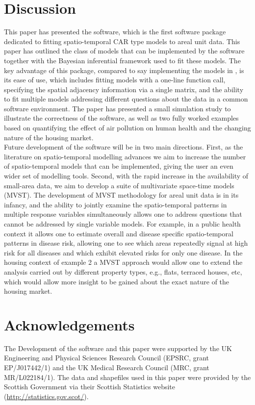 \documentclass[article, nojss]{jss}
\begin{document}
\section{Discussion}
This paper has presented the  software, which is the first software package dedicated to fitting spatio-temporal CAR type models to areal unit data. This paper has outlined the class of models that can be implemented by the software together with the Bayesian inferential framework used to fit these models. The key advantage of this package, compared to say implementing the models in , is its ease of use, which includes fitting models with a one-line function call, specifying the spatial adjacency information via a single matrix, and the ability to fit multiple models addressing different questions about the data in a common software environment. The paper has presented a small simulation study to illustrate the correctness of the software, as well as two fully worked examples based on quantifying the effect of air pollution on human health and the changing nature of the housing market.\\

Future development of the software will be in two main directions. First, as the literature on spatio-temporal modelling advances we aim to increase the number of spatio-temporal models that can be implemented, giving the user an even wider set of modelling tools. Second, with the rapid increase in the availability of small-area data, we aim to develop a suite of multivariate space-time models (MVST). The development of MVST methodology for areal unit data is in its infancy, and the ability to jointly examine the spatio-temporal patterns in multiple response variables simultaneously allows one to address questions that cannot be addressed by single variable models. For example, in a public health context it allows one to estimate overall and disease specific spatio-temporal  patterns in disease risk, allowing one to see which areas repeatedly signal at high risk for all diseases and which exhibit elevated risks for only one disease. In the housing context of example 2 a MVST approach would allow one to extend the analysis carried out by different property types, e.g., flats, terraced houses, etc, which would allow more insight to be gained about the exact nature of the housing market.  





\section{Acknowledgements}
The Development of the  software and this paper were supported by the UK Engineering and Physical Sciences Research Council (EPSRC, grant EP/J017442/1) and the UK Medical Research Council (MRC, grant MR/L022184/1). The data and shapefiles used in this paper were provided by the Scottish Government via their Scottish Statistics website (\url{http://statistics.gov.scot/}).



\end{document}
